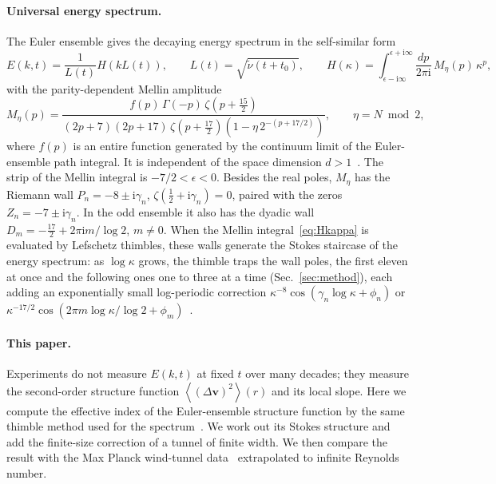 \documentclass[floatfix,aps,pre,preprint,superscriptaddress,nofootinbib,amsmath,amssymb]{revtex4-2}
\def\I{\mathrm{i}}
\def\VEV#1{\left\langle #1 \right\rangle}
\newcommand{\vect}[1]{\boldsymbol{#1}}
\begin{document}
\paragraph*{Universal energy spectrum.}
The Euler ensemble gives the decaying energy spectrum in the self-similar form~\cite{migdal2024quantum, migdal2026Riemann}
\begin{equation}
    E(k,t)=\frac{1}{L(t)}H\left(kL(t)\right),\qquad L(t)=\sqrt{\tilde\nu(t+t_0)},\qquad
    H(\kappa)=\int_{\epsilon-\I\infty}^{\epsilon+\I\infty}\frac{dp}{2\pi\I}\,M_\eta(p)\,\kappa^{p},
    \label{eq:Hkappa}
\end{equation}
with the parity-dependent Mellin amplitude
\begin{equation}
    M_\eta(p)=\frac{f(p)\,\Gamma(-p)\,\zeta\!\left(p+\frac{15}{2}\right)}
    {(2p+7)(2p+17)\,\zeta\!\left(p+\frac{17}{2}\right)\left(1-\eta\,2^{-(p+17/2)}\right)},\qquad \eta=N\bmod 2 ,
    \label{eq:Mtheor}
\end{equation}
where $f(p)$ is an entire function generated by the continuum limit of the Euler-ensemble path integral. It is independent
of the space dimension $d>1$~\cite{ReviewPaperAM}. The strip of the Mellin integral is $-7/2<\epsilon<0$. Besides the real
poles, $M_\eta$ has the Riemann wall $P_n=-8\pm\I\gamma_n$, $\zeta(\tfrac12+\I\gamma_n)=0$, paired with the zeros
$Z_n=-7\pm\I\gamma_n$. In the odd ensemble it also has the dyadic wall
$D_m=-\tfrac{17}{2}+2\pi\I m/\log 2$, $m\neq0$. When the Mellin integral~\eqref{eq:Hkappa} is evaluated by Lefschetz
thimbles, these walls generate the Stokes staircase of the energy spectrum: as $\log\kappa$ grows, the thimble traps the wall
poles, the first eleven at once and the following ones one to three at a time (Sec.~\ref{sec:method}), each adding an
exponentially small log-periodic correction $\kappa^{-8}\cos(\gamma_n\log\kappa+\phi_n)$ or
$\kappa^{-17/2}\cos(2\pi m\log\kappa/\log 2+\phi_m)$~\cite{migdal2026Riemann}.

\paragraph*{This paper.}
Experiments do not measure $E(k,t)$ at fixed $t$ over many decades; they measure the second-order structure function
$\VEV{(\Delta\vect v)^2}(r)$ and its local slope. Here we compute the effective index of the Euler-ensemble structure function
by the same thimble method used for the spectrum~\cite{migdal2026Riemann}. We work out its Stokes structure and add the
finite-size correction of a tunnel of finite width. We then compare the result with the Max Planck wind-tunnel
data~\cite{GregXi2} extrapolated to infinite Reynolds number.
\end{document}
